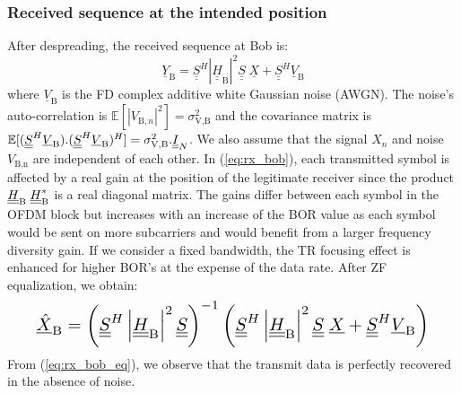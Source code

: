 \documentclass[conference]{IEEEtran}
\begin{document}
\subsubsection{Received sequence at the intended position}
After despreading, the received sequence at Bob is:
\begin{equation}
    \underline{Y}_{\text{B}} = \underline{\underline{S}}^H  \left|\underline{\underline{H}}_{\text{B}} \right|^2\underline{\underline{S}}\; \underline{X} +  \underline{\underline{S}}^H \underline{V}_\text{B} 
    \label{eq:rx_bob}
\end{equation}
where $\underline{V}_\text{B}$ is the FD complex additive white Gaussian noise (AWGN). The noise's auto-correlation is $\mathbb{E}[ \left|V_{\text{B},n}\right|^2 ]  = \sigma_{\text{V,B}}^2$ and the covariance matrix is $\mathbb{E}[(\underline{\underline{S}}^H  \underline{V}_\text{B}) . (\underline{\underline{S}}^H \underline{V}_\text{B})^H ] = \sigma_{\text{V,B}}^2 . \underline{\underline{I}}_N$. We also assume that the signal $X_n$ and noise $V_{\text{B,n}}$ are independent of each other. In (\ref{eq:rx_bob}), each transmitted symbol is affected by a real gain at the position of the legitimate receiver since the product $\underline{\underline{H}}_{\text{B}}\;\underline{\underline{H}}^*_{\text{B}}$ is a real diagonal matrix. The gains differ between each symbol in the OFDM block but increases with an increase of the BOR value as each symbol would be sent on more subcarriers and would benefit from a larger frequency diversity gain. If we consider a fixed bandwidth, the TR focusing effect is enhanced for higher BOR's at the expense of the data rate. After ZF equalization, we obtain:
\begin{equation}
\resizebox{0.91\hsize}{!}{$
    \underline{\hat{X}}_{\text{B}} = \left(\underline{\underline{S}}^H  \left|\underline{\underline{H}}_{\text{B}} \right|^2\underline{\underline{S}}\right)^{-1} \left(\underline{\underline{S}}^H  \left|\underline{\underline{H}}_{\text{B}} \right|^2\underline{\underline{S}}\; \underline{X} +  \underline{\underline{S}}^H \underline{V}_\text{B}\right)$}
    \label{eq:rx_bob_eq}
\end{equation}
From (\ref{eq:rx_bob_eq}), we observe that the transmit data is perfectly recovered in the absence of noise.
\end{document}
